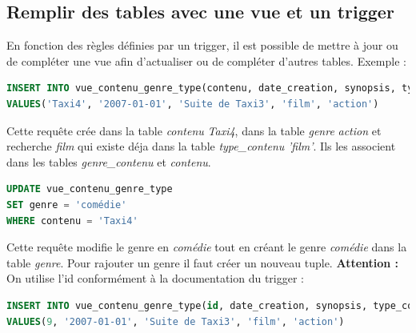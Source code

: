 \subsection{Remplir des tables avec une vue et un trigger}

En fonction des règles définies par un trigger, il est possible de mettre à jour ou de compléter une vue afin d'actualiser ou de compléter d'autres tables. Exemple :
\begin{lstlisting}[language=SQL]
INSERT INTO vue_contenu_genre_type(contenu, date_creation, synopsis, type_contenu, genre)
VALUES('Taxi4', '2007-01-01', 'Suite de Taxi3', 'film', 'action')
\end{lstlisting}

Cette requête crée dans la table \textit{contenu} \textit{Taxi4}, dans la table \textit{genre} \textit{action} et recherche \textit{film} qui existe déja dans la table \textit{type\_contenu} \textit{'film'}. Ils les associent dans les tables \textit{genre\_contenu} et \textit{contenu}.
\begin{lstlisting}[language=SQL]
UPDATE vue_contenu_genre_type 
SET genre = 'comédie' 
WHERE contenu = 'Taxi4'
\end{lstlisting}

Cette requête modifie le genre en \textit{comédie} tout en créant le genre \textit{comédie} dans la table \textit{genre}. Pour rajouter un genre il faut créer un nouveau tuple. \textbf{Attention :} On utilise l'id conformément à la documentation du trigger : 
\begin{lstlisting}[language=SQL]
INSERT INTO vue_contenu_genre_type(id, date_creation, synopsis, type_contenu, genre)
VALUES(9, '2007-01-01', 'Suite de Taxi3', 'film', 'action')
\end{lstlisting}